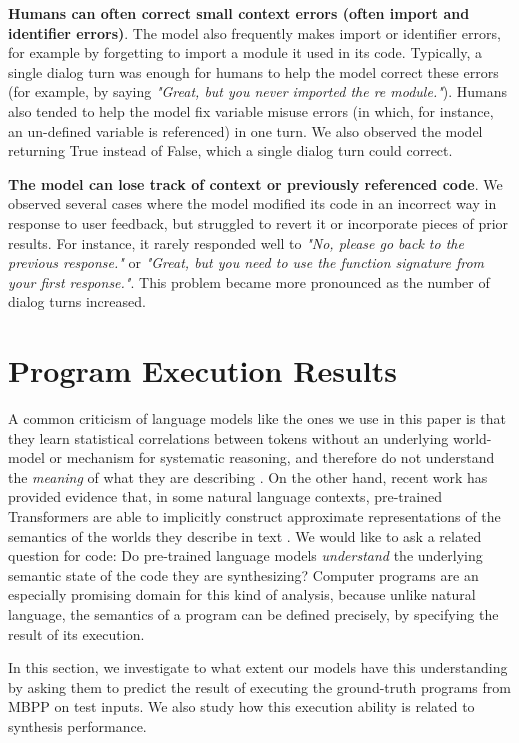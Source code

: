 \textbf{Humans can often correct small context errors (often import and identifier errors)}. The model also frequently makes import or identifier errors, for example by forgetting to import a module it used in its code. Typically, a single dialog turn was enough for humans to help the model correct these errors (for example, by saying \textit{"Great, but you never imported the re module."}). Humans also tended to help the model fix variable misuse errors (in which, for instance, an un-defined variable is referenced) in one turn. We also observed the model returning True instead of False, which a single dialog turn could correct.

\textbf{The model can lose track of context or previously referenced code}. We observed several cases where the model modified its code in an incorrect way in response to user feedback, but struggled to revert it or incorporate pieces of prior results. For instance, it rarely responded well to \textit{"No, please go back to the previous response."} or \textit{"Great, but you need to use the function signature from your first response."}. This problem became more pronounced as the number of dialog turns increased. 

\section{Program Execution Results}
\label{section:execution_results}
A common criticism of language models like the ones we use in this paper is that they learn statistical correlations between tokens without an underlying world-model or mechanism for systematic reasoning, and therefore do not understand the \textit{meaning} of what they are describing \citep{bender-koller-2020-climbing}. On the other hand, recent work has provided evidence that, in some natural language contexts, pre-trained Transformers are able to implicitly construct approximate representations of the semantics of the worlds they describe in text \citep{Li2021ImplicitRO}. We would like to ask a related question for code: Do pre-trained language models \textit{understand} the underlying semantic state of the code they are synthesizing? Computer programs are an especially promising domain for this kind of analysis, because unlike natural language, the semantics of a program can be defined precisely, by specifying the result of its execution.

In this section, we investigate to what extent our models have this understanding by asking them to predict the result of executing the ground-truth programs from MBPP on test inputs. We also study how this execution ability is related to synthesis performance.

